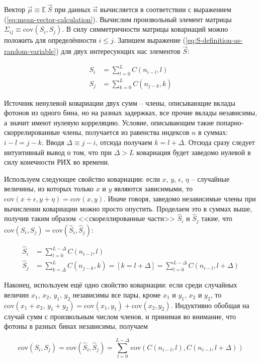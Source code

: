\documentclass[12pt]{book}
\newcommand{\cov}{\mathrm{cov}}
\begin{document}
	Вектор $\vec{\mu} \equiv \mathbb{E} \, \vec{S}$ при данных $\vec{n}$ вычисляется в соответствии с выражением (\ref{eq:mean-vector-calculation}). Вычислим произвольный элемент матрицы $\Sigma_{ij} \equiv \cov\left( S_i, S_j \right)$. В силу симметричности матрицы ковариаций можно положить для определённости $i \le j$. Запишем выражение (\ref{eq:S-definition-as-random-variable}) для двух интересующих нас элементов $\vec{S}$:
	
	\begin{align}
		S_i &= \sum_{l=0}^{L} C(n_{i-l}, l)\\
		S_j &= \sum_{k=0}^{L} C(n_{j-k}, k)
	\end{align}

	Источник ненулевой ковариации двух сумм -- члены, описывающие вклады фотонов из одного бина, но на разных задержках, все прочие вклады независимы, а значит имеют нулевую корреляцию. Условие, описывающим такие попарно-скоррелированные члены, получается из равенства индексов $n$ в суммах: $i-l = j-k$. Вводя $\Delta \equiv j - i$, отсюда получаем $k = l + \Delta$. Отсюда сразу следует интуитивный вывод о том, что при $\Delta > L$ ковариация будет заведомо нулевой в силу конечности РИХ во времени.

	Используем следующее свойство ковариации: если $x$, $y$, $\epsilon$, $\eta$ -- случайные величины, из которых только $x$ и $y$ являются зависимыми, то $\cov(x + \epsilon, y + \eta) = \cov(x, y)$. Иначе говоря, заведомо независимые члены при вычислении ковариации можно просто опустить. Проделаем это в суммах выше, получив таким образом <<скореллированные части>> $\hat{S}_i$ и $\hat{S}_j$ такие, что $\cov ( S_i, S_j  ) = \cov ( \hat{S}_i, \hat{S}_j )$:
	
	\begin{align}
		\hat{S}_i &= \sum_{l=0}^{L-\Delta} C(n_{i-l}, l)\\
		\hat{S}_j &= \sum_{k=\Delta}^{L} C(n_{j-k}, k) = \left[k=l+\Delta\right] = \sum_{l=0}^{L-\Delta} C(n_{i-l}, l+\Delta)
	\end{align}

	Наконец, используем ещё одно свойство ковариации: если среди случайных величин $x_1$, $x_2$, $y_1$, $y_2$ независимы все пары, кроме $x_1$ и $y_1$, $x_2$ и $y_2$, то $\cov(x_1 + x_2, \, y_1 + y_2) = \cov(x_1, y_1) + \cov(x_2, y_2)$. Индуктивно обобщая на случай сумм с произвольным числом членов, и принимая во внимание, что фотоны в разных бинах независимы, получаем
	
	\begin{equation}
		\cov(S_i, S_j) = \cov(\hat{S}_i, \hat{S}_j) = \sum_{l=0}^{L - \Delta} \cov(C(n_{i-l}, l), C(n_{i-l}, l + \Delta))
	\end{equation}
\end{document}
